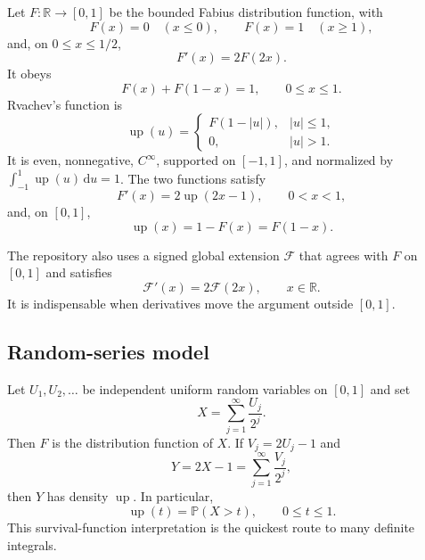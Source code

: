 \documentclass[11pt,oneside]{article}
\theoremstyle{definition}
\theoremstyle{remark}
\newcommand{\R}{\mathbb R}
\newcommand{\Prob}{\mathbb P}
\newcommand{\dd}{\,\mathrm d}
\newcommand{\upf}{\operatorname{up}}
\begin{document}
Let $F:\R\to[0,1]$ be the bounded Fabius distribution function, with
\begin{equation}\label{eq:F-boundary}
 F(x)=0\quad(x\le0),
 \qquad F(x)=1\quad(x\ge1),
\end{equation}
and, on $0\le x\le1/2$,
\begin{equation}\label{eq:F-differential}
 F'(x)=2F(2x).
\end{equation}
It obeys
\begin{equation}\label{eq:F-symmetry}
 F(x)+F(1-x)=1,
 \qquad 0\le x\le1.
\end{equation}
Rvachev's function is
\begin{equation}\label{eq:up-definition}
 \upf(u)=
 \begin{cases}
 F(1-|u|),&|u|\le1,\\
 0,&|u|>1.
 \end{cases}
\end{equation}
It is even, nonnegative, $C^\infty$, supported on $[-1,1]$, and normalized by
$\int_{-1}^{1}\upf(u)\dd u=1$.  The two functions satisfy
\begin{equation}\label{eq:Fprime-up}
 F'(x)=2\upf(2x-1),
 \qquad 0<x<1,
\end{equation}
and, on $[0,1]$,
\begin{equation}\label{eq:up-survival}
 \upf(x)=1-F(x)=F(1-x).
\end{equation}

The repository also uses a signed global extension $\mathcal F$ that agrees with $F$ on $[0,1]$ and satisfies
\begin{equation}\label{eq:signed-differential}
 \mathcal F'(x)=2\mathcal F(2x),
 \qquad x\in\R.
\end{equation}
It is indispensable when derivatives move the argument outside $[0,1]$.

\subsection{Random-series model}

Let $U_1,U_2,\ldots$ be independent uniform random variables on $[0,1]$ and set
\begin{equation}\label{eq:X-random-series}
 X=\sum_{j=1}^{\infty}\frac{U_j}{2^j}.
\end{equation}
Then $F$ is the distribution function of $X$.  If $V_j=2U_j-1$ and
\begin{equation}\label{eq:Y-random-series}
 Y=2X-1=\sum_{j=1}^{\infty}\frac{V_j}{2^j},
\end{equation}
then $Y$ has density $\upf$.  In particular,
\begin{equation}\label{eq:up-tail-probability}
 \upf(t)=\Prob(X>t),
 \qquad 0\le t\le1.
\end{equation}
This survival-function interpretation is the quickest route to many definite integrals.
\end{document}
